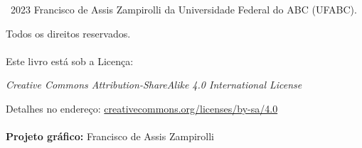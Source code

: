 %
%     

\textcopyright\ 2023 Francisco de Assis Zampirolli da Universidade Federal do ABC (UFABC). 

Todos os direitos reservados. \\ \\

Este livro está sob a Licença: 

\hspace{1cm}\textit{Creative Commons
Attribution-ShareAlike 4.0 International License}

\hspace{1cm}Detalhes no endereço: \href{https://creativecommons.org/licenses/by-sa/4.0}{creativecommons.org/licenses/by-sa/4.0}\\ \\


\textbf{Projeto gráfico:} Francisco de Assis Zampirolli \\

